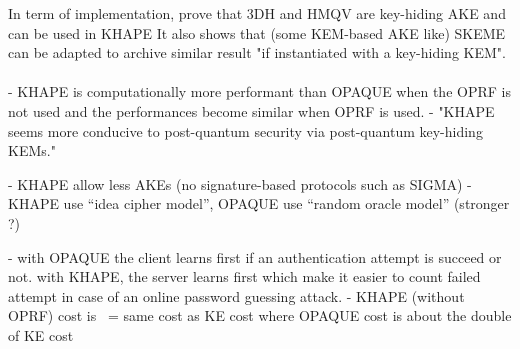 \documentclass[../report.tex]{subfiles}
\begin{document}
In term of implementation, \cite{KHAPE_Paper} prove that 3DH and HMQV are key-hiding AKE and can be used in KHAPE %
It also shows that (some KEM-based AKE like) SKEME can be adapted to archive similar result "if instantiated with a key-hiding KEM". %


\paragraph{}
- KHAPE is computationally more performant than OPAQUE when the OPRF is not used and the performances become similar when OPRF is used.
- "KHAPE seems more conducive to post-quantum security via post-quantum key-hiding KEMs."

- KHAPE allow less AKEs (no signature-based protocols such as SIGMA)
- KHAPE use ``idea cipher model'', OPAQUE use ``random oracle model'' (stronger ?)

- with OPAQUE the client learns first if an authentication attempt is succeed or not. with KHAPE, the server learns first which make it easier to count failed attempt in case of an online password guessing attack.
- KHAPE (without OPRF) cost is ~= same cost as KE cost where OPAQUE cost is about the double of KE cost





\paragraph{}
\end{document}
